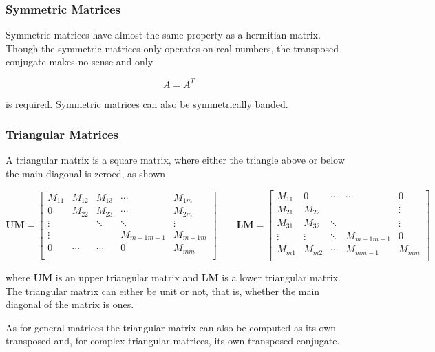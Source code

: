 \subsubsection{Symmetric Matrices}

Symmetric matrices have almost the same property as a hermitian
matrix. Though the symmetric matrices only operates on real numbers,
the transposed conjugate makes no sense and only

\[A = A^T\]

is required. Symmetric matrices can also be symmetrically banded. 


\subsubsection{Triangular Matrices}

A triangular matrix is a square matrix, where either the triangle
above or below the main diagonal is zeroed, as shown 

\[
\mathbf{UM} = \left[
\begin{array}{ccccc}
M_{11}  & M_{12} & M_{13} &  \cdots  & M_{1m} \\
0       & M_{22} & M_{23}  & \cdots  & M_{2m} \\
\vdots  &        & \ddots &  \ddots &  \vdots \\
\vdots  &        &        &  M_{m-1m-1} & M_{m-1m} \\
0       & \cdots & \cdots  & 0      &  M_{mm} \\
\end{array}
\right]
\qquad
\mathbf{LM} = \left[
\begin{array}{ccccc}
M_{11}  & 0     & \cdots &   \cdots  & 0 \\
M_{21}  & M_{22} &        &          &\vdots \\
M_{31}  & M_{32} & \ddots &          &  \vdots \\
\vdots & \vdots & \ddots &  M_{m-1m-1} & 0 \\
M_{m1}  & M_{m2} & \cdots  & M_{mm-1} &  M_{mm} \\
\end{array}
\right]
\]

where $\mathbf{UM}$ is an upper triangular matrix and $\mathbf{LM}$ is
a lower triangular matrix. The triangular matrix can either be unit or
not, that is, whether the main diagonal of the matrix is ones.

As for general matrices the triangular matrix can also be computed as
its own transposed and, for complex triangular matrices, its own
transposed conjugate.

